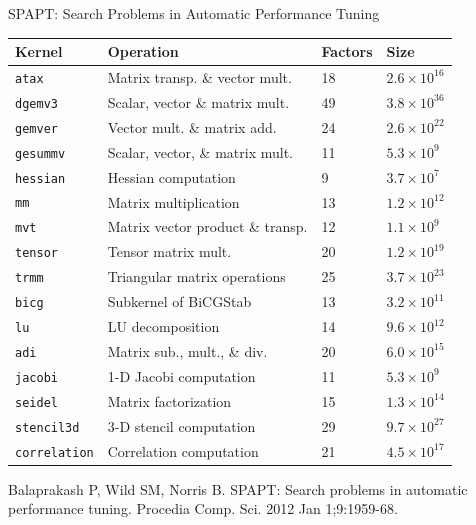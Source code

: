 \documentclass[10pt, compress, aspectratio=169, xcolor={table,usenames,dvipsnames}]{beamer}
\begin{document}
\begin{frame}[label={sec:org9c91235},fragile]{SPAPT: Search Problems in Automatic Performance Tuning}
 \begin{center}
\begin{table}[t]
\label{tab:org1fffa28}
\centering
\scriptsize
\begin{tabular}{llll}
\toprule
Kernel & Operation & Factors & Size\\
\midrule
\texttt{atax} & Matrix transp. \& vector mult. & 18 & \(2.6 \times 10^{16}\)\\
\texttt{dgemv3} & Scalar, vector \& matrix mult. & 49 & \(3.8 \times 10^{36}\)\\
\texttt{gemver} & Vector mult. \& matrix add. & 24 & \(2.6 \times 10^{22}\)\\
\texttt{gesummv} & Scalar, vector, \& matrix mult. & 11 & \(5.3 \times 10^{9}\)\\
\texttt{hessian} & Hessian computation & 9 & \(3.7 \times 10^{7}\)\\
\texttt{mm} & Matrix multiplication & 13 & \(1.2 \times 10^{12}\)\\
\texttt{mvt} & Matrix vector product \& transp. & 12 & \(1.1 \times 10^{9}\)\\
\texttt{tensor} & Tensor matrix mult. & 20 & \(1.2 \times 10^{19}\)\\
\texttt{trmm} & Triangular matrix operations & 25 & \(3.7 \times 10^{23}\)\\
\texttt{bicg} & Subkernel of BiCGStab & 13 & \(3.2 \times 10^{11}\)\\
\texttt{lu} & LU decomposition & 14 & \(9.6 \times 10^{12}\)\\
\texttt{adi} & Matrix sub., mult., \& div. & 20 & \(6.0 \times 10^{15}\)\\
\texttt{jacobi} & 1-D Jacobi computation & 11 & \(5.3 \times 10^{9}\)\\
\texttt{seidel} & Matrix factorization & 15 & \(1.3 \times 10^{14}\)\\
\texttt{stencil3d} & 3-D stencil computation & 29 & \(9.7 \times 10^{27}\)\\
\texttt{correlation} & Correlation computation & 21 & \(4.5 \times 10^{17}\)\\
\bottomrule
\end{tabular}
\end{table}

\scriptsize{Balaprakash P, Wild SM, Norris B. SPAPT: Search problems in automatic performance tuning. Procedia Comp. Sci. 2012 Jan 1;9:1959-68.}
\end{center}
\end{frame}
\end{document}
